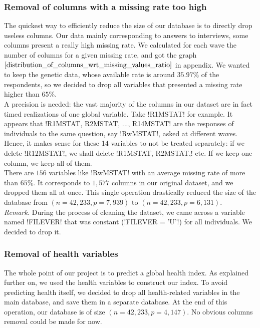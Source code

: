 \documentclass[]{article}
\begin{document}
\subsubsection{Removal of columns with a missing rate too high}
The quickest way to efficiently reduce the size of our database is to directly drop useless columns. Our data mainly corresponding to answers to interviews, some columns present a really high missing rate. We calculated for each wave the number of columns for a given missing rate, and got the graph $\ref{distribution_of_columns_wrt_missing_values_ratio}$ in appendix. We wanted to keep the genetic data, whose available rate is around $35.97$\% of the respondents, so we decided to drop all variables that presented a missing rate higher than $65\%$.\\
A precision is needed: the vast majority of the columns in our dataset are in fact timed realizations of one global variable. Take \pyth!R1MSTAT! for example. It appears that \pyth!R1MSTAT, R2MSTAT, ..., R14MSTAT! are the responses of individuals to the same question, say \pyth!RwMSTAT!, asked at different waves. Hence, it makes sense for these 14 variables to not be treated separately: if we delete \pyth!R12MSTAT!, we shall delete \pyth!R1MSTAT, R2MSTAT,! etc. If we keep one column, we keep all of them.\\
There are $156$ variables like \pyth!RwMSTAT! with an average missing rate of more than $65$\%. It corresponds to $1,577$ columns in our original dataset, and we dropped them all at once. This single operation drastically reduced the size of the database from $(n = 42,233, p = 7,939)$ to $(n = 42,233, p = 6,131)$.\\

\noindent
\textit{Remark.} During the process of cleaning the dataset, we came across a variable named \pyth!FILEVER! that was constant (\pyth!FILEVER = 'U'!) for all individuals. We decided to drop it.

\subsubsection{Removal of health variables}
The whole point of our project is to predict a global health index. As explained further on, we used the health variables to construct our index. To avoid predicting health itself, we decided to drop all health-related variables in the main database, and save them in a separate database. At the end of this operation, our database is of size $(n = 42,233, p = 4,147)$. No obvious columns removal could be made for now.
\end{document}

